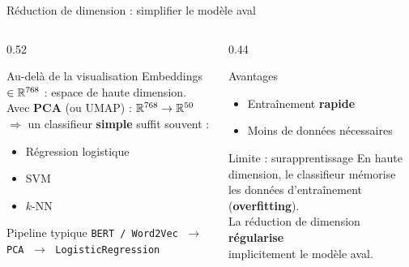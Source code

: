 \documentclass[aspectratio=169, 10pt]{beamer}
\begin{document}
\begin{frame}{Réduction de dimension : simplifier le modèle aval}
  \begin{columns}[T]
    \begin{column}{0.52\textwidth}
      \begin{block}{Au-delà de la visualisation}
        Embeddings $\in \mathbb{R}^{768}$ : espace de haute dimension.\\[4pt]
        Avec \textbf{PCA} (ou UMAP) : $\mathbb{R}^{768} \to \mathbb{R}^{50}$\\[4pt]
        $\Rightarrow$ un classifieur \textbf{simple} suffit souvent :
        \begin{itemize}
          \item Régression logistique
          \item SVM
          \item $k$-NN
        \end{itemize}
      \end{block}
      \smallskip
      \begin{exampleblock}{Pipeline typique}
        \centering\small
        \texttt{BERT / Word2Vec}
        $\;\to\;$ \texttt{PCA}
        $\;\to\;$ \texttt{LogisticRegression}
      \end{exampleblock}
    \end{column}
    \begin{column}{0.44\textwidth}
      \begin{exampleblock}{Avantages}
        \begin{itemize}
          \item Entraînement \textbf{rapide}
          \item Moins de données nécessaires
        \end{itemize}
      \end{exampleblock}
      \vspace{4pt}
      \begin{alertblock}{Limite : surapprentissage}
        En haute dimension, le classifieur mémorise\\
        les données d'entraînement (\textbf{overfitting}).\\[3pt]
        La réduction de dimension \textbf{régularise}\\
        implicitement le modèle aval.
      \end{alertblock}
    \end{column}
  \end{columns}
\end{frame}
\end{document}

